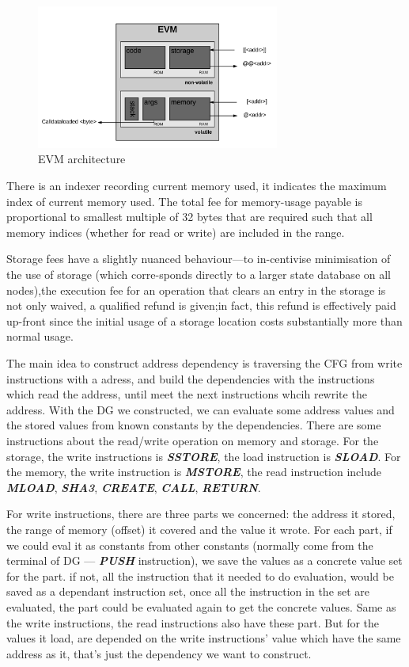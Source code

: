 \documentclass{article}
\begin{document}
\begin{figure}[ht!]
\centering
\includegraphics[width=80mm]{EVM.png}
\caption{EVM architecture\label{overflow}}
\end{figure}

There is an indexer recording current memory used, it indicates the maximum index of current memory used. The total fee for memory-usage payable is proportional to smallest multiple of 32 bytes  that  are  required  such  that  all  memory  indices (whether for read or write) are included in the range\cite{wood2014ethereum}.

Storage fees have a slightly nuanced behaviour—to in-centivise minimisation of the use of storage (which corre-sponds directly to a larger state database on all nodes),the execution fee for an operation that clears an entry in the storage is not only waived, a qualified refund is given;in fact, this refund is effectively paid up-front since the initial usage of a storage location costs substantially more than normal usage\cite{wood2014ethereum}.

The main idea to construct address dependency is traversing the CFG from write instructions with a adress, and build the dependencies with the instructions which read the address, until meet the next instructions whcih rewrite the address. With the DG we constructed, we can evaluate some address values and the stored values from known constants by the dependencies. There are some instructions about the read/write operation on memory and storage. For the storage, the write instructions is \textbf{\textit{SSTORE}}, the load instruction is \textbf{\textit{SLOAD}}. For the memory, the write instruction is \textbf{\textit{MSTORE}}, the read instruction include \textbf{\textit{MLOAD}}, \textbf{\textit{SHA3}}, \textbf{\textit{CREATE}}, \textbf{\textit{CALL}}, \textbf{\textit{RETURN}}.

For write instructions, there are three parts we concerned: the address it stored, the range of memory (offset) it covered and the value it wrote. For each part, if we could eval it as constants from other constants (normally come from the terminal of DG --- \textbf{\textit{PUSH}} instruction), we save the values as a concrete value set for the part. if not, all the instruction that it needed to do evaluation, would be saved as a dependant instruction set, once all the instruction in the set are evaluated, the part could be evaluated again to get the concrete values. Same as the write instructions, the read instructions also have these part. But for the values it load, are depended on the write instructions' value which have the same address as it, that's just the dependency we want to construct.
\end{document}
